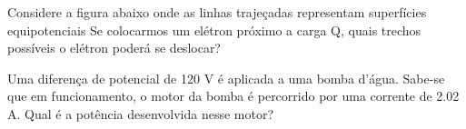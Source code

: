 \documentclass[12pt, addpoints]{exam}
\begin{document}
\begin{questions}
\begin{multicols*}{2}
\begin{oneparchoices}
\end{oneparchoices}
\question[20] Considere a figura abaixo onde as linhas trajeçadas representam superfícies equipotenciais Se colocarmos um elétron próximo a carga Q, quais trechos possíveis o elétron poderá se deslocar?
        
        \begin{center}
            \begin{minipage}[c]{0.5\linewidth}
            \end{minipage}
        \end{center}
        
        

\begin{oneparchoices}
\end{oneparchoices}
\question[20] Uma diferença de potencial de 120 V é aplicada a uma bomba d’água. Sabe-se que em funcionamento, o motor da bomba é percorrido por uma corrente de    2.02 A. Qual é a potência desenvolvida nesse motor?


\end{multicols*}
\end{questions}
\end{document}
